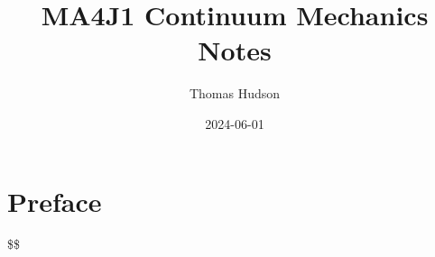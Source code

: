 \documentclass[
  letterpaper,
  DIV=11,
  numbers=noendperiod]{scrreprt}
\title{MA4J1 Continuum Mechanics Notes}
\author{Thomas Hudson}
\date{2024-06-01}
\renewcommand*\contentsname{Table of contents}
\newcommand\contentsname{Table of contents}
\theoremstyle{plain}
\theoremstyle{remark}
\begin{document}
\maketitle

\renewcommand*\contentsname{Table of contents}
{
\hypersetup{linkcolor=}
\setcounter{tocdepth}{2}
\tableofcontents
}


\chapter*{Preface}\label{preface}


\$\$ \newcommand{\bfa}{{\boldsymbol{a}}}
\newcommand{\bfb}{{\boldsymbol{b}}} \newcommand{\bfc}{{\boldsymbol{c}}}
\newcommand{\bfd}{{\boldsymbol{d}}} \newcommand{\bfe}{{\boldsymbol{e}}}
\newcommand{\bff}{{\boldsymbol{f}}} \newcommand{\bfg}{{\boldsymbol{g}}}
\newcommand{\bfh}{{\boldsymbol{h}}} \newcommand{\bfi}{{\boldsymbol{i}}}
\newcommand{\bfj}{{\boldsymbol{j}}} \newcommand{\bfk}{{\boldsymbol{k}}}
\newcommand{\bfl}{{\boldsymbol{l}}} \newcommand{\bfm}{{\boldsymbol{m}}}
\newcommand{\bfn}{{\boldsymbol{n}}} \newcommand{\bfo}{{\boldsymbol{o}}}
\newcommand{\bfp}{{\boldsymbol{p}}} \newcommand{\bfq}{{\boldsymbol{q}}}
\newcommand{\bfr}{{\boldsymbol{r}}} \newcommand{\bfs}{{\boldsymbol{s}}}
\newcommand{\bft}{{\boldsymbol{t}}} \newcommand{\bfu}{{\boldsymbol{u}}}
\newcommand{\bfv}{{\boldsymbol{v}}} \newcommand{\bfw}{{\boldsymbol{w}}}
\newcommand{\bfx}{{\boldsymbol{x}}} \newcommand{\bfy}{{\boldsymbol{y}}}
\newcommand{\bfz}{{\boldsymbol{z}}}

\newcommand{\bfA}{{\boldsymbol{A}}}
\newcommand{\bfB}{{\boldsymbol{B}}}
\newcommand{\bfC}{{\boldsymbol{C}}}
\newcommand{\bfD}{{\boldsymbol{D}}}
\newcommand{\bfE}{{\boldsymbol{E}}}
\newcommand{\bfF}{{\boldsymbol{F}}}
\newcommand{\bfG}{{\boldsymbol{G}}}
\newcommand{\bfH}{{\boldsymbol{H}}}
\newcommand{\bfI}{{\boldsymbol{I}}}
\newcommand{\bfJ}{{\boldsymbol{J}}}
\newcommand{\bfK}{{\boldsymbol{K}}}
\newcommand{\bfL}{{\boldsymbol{L}}}
\newcommand{\bfM}{{\boldsymbol{M}}}
\newcommand{\bfN}{{\boldsymbol{N}}}
\newcommand{\bfO}{{\boldsymbol{O}}}
\newcommand{\bfP}{{\boldsymbol{P}}}
\newcommand{\bfQ}{{\boldsymbol{Q}}}
\newcommand{\bfR}{{\boldsymbol{R}}}
\newcommand{\bfS}{{\boldsymbol{S}}}
\newcommand{\bfT}{{\boldsymbol{T}}}
\newcommand{\bfU}{{\boldsymbol{U}}}
\newcommand{\bfV}{{\boldsymbol{V}}}
\newcommand{\bfW}{{\boldsymbol{W}}}
\newcommand{\bfX}{{\boldsymbol{X}}}
\newcommand{\bfY}{{\boldsymbol{Y}}}
\newcommand{\bfZ}{{\boldsymbol{Z}}}
\end{document}

